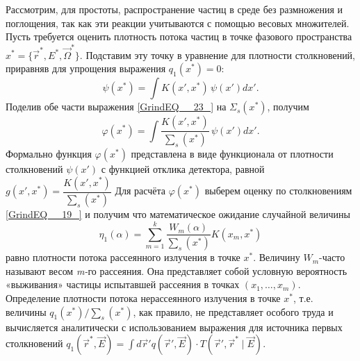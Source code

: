 \documentclass[
11pt,
master, %
subf, %
href, %
colorlinks=true, %
]{disser}
\begin{document}
Рассмотрим, для простоты, распространение частиц в среде без размножения и поглощения, так как эти реакции учитываются с помощью весовых множителей. Пусть требуется оценить плотность потока частиц в точке фазового пространства $x^{*} =\{ \vec{r}^{*} ,E^{*} ,\vec{\Omega }^{*} \} $. Подставим эту точку в уравнение для плотности столкновений, приравняв для упрощения выражения $q_{1} (x^{*} )=0$:
\begin{equation} \label{GrindEQ__23_}
\psi (x^{*} )=\int K \left(x',x^{*} \right)\,  \psi \left(x' \right)dx'.
\end{equation}
Поделив обе части выражения \eqref{GrindEQ__23_} на $\Sigma _{s} (x^{*} )$, получим
\begin{equation} \label{GrindEQ__24_}
\varphi (x^{*} )=\int \frac{K\left(x',x^{*} \right)}{\sum _{s} (x^{*} )} \,  \psi (x')dx'.
\end{equation}
Формально функция $\varphi (x^{*} )$ представлена в виде функционала от плотности столкновений $\psi (x')$ с функцией отклика детектора, равной
$g \left(x',x^{*} \right)=\dfrac{K \left(x',x^{*} \right)}{\sum _{s} (x^{*} )}$
Для расчёта $\varphi (x^{*} )$ выберем оценку по столкновениям \eqref{GrindEQ__19_} и получим что математическое ожидание случайной величины
\begin{equation} \label{GrindEQ__25_}
\eta _{1} (\alpha )=\sum _{m=1}^{k}\frac{W_{m} (\alpha )}{\sum _{s} (x^{*} )} K(x_{m} ,x^{*} )
\end{equation}
равно плотности потока рассеянного излучения в точке $x^{*} $. Величину $W_{m} $-часто называют весом \textit{m-}го рассеяния. Она представляет собой условную вероятность «выживания» частицы испытавшей рассеяния в точках $(x_{1} ,\ldots ,x_{m} )$.  Определение плотности потока нерассеянного излучения в точке $x^{*} $, т.е. величины  $q_{1} (x^{*} )/\sum_{s} (x^{*} )$, как правило, не представляет особого труда и вычисляется аналитически с использованием выражения для источника первых столкновений
$q_{1} \left(\vec{r}^{*} ,\vec{E} \right)=\int d\vec{r} 'q \left(\vec{r}',\vec{E} \right)\cdot T\left(\vec{r}',\vec{r}^{*} \mid \vec{E} \right).$
\end{document}
